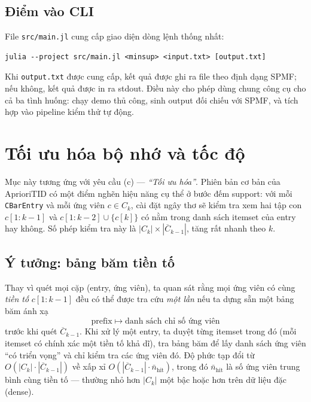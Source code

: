 \subsection{Điểm vào CLI}

File \texttt{src/main.jl} cung cấp giao diện dòng lệnh thống nhất:

\begin{verbatim}
julia --project src/main.jl <minsup> <input.txt> [output.txt]
\end{verbatim}

Khi \texttt{output.txt} được cung cấp, kết quả được ghi ra file theo định dạng SPMF; nếu không, kết quả được in ra stdout. Điều này cho phép dùng chung công cụ cho cả ba tình huống: chạy demo thủ công, sinh output đối chiếu với SPMF, và tích hợp vào pipeline kiểm thử tự động.

\section{Tối ưu hóa bộ nhớ và tốc độ}
\label{sec:impl-optimization}

Mục này tương ứng với yêu cầu (c) --- \emph{``Tối ưu hóa''}. Phiên bản cơ bản của AprioriTID có một điểm nghẽn hiệu năng cụ thể ở bước đếm support: với mỗi \texttt{CBarEntry} và mỗi ứng viên $c \in C_k$, cài đặt ngây thơ sẽ kiểm tra xem hai tập con $c[1{:}k{-}1]$ và $c[1{:}k{-}2] \cup \{c[k]\}$ có nằm trong danh sách itemset của entry hay không. Số phép kiểm tra này là $|C_k| \times |\overline{C}_{k-1}|$, tăng rất nhanh theo $k$.

\subsection{Ý tưởng: bảng băm tiền tố}

Thay vì quét mọi cặp (entry, ứng viên), ta quan sát rằng mọi ứng viên có cùng \emph{tiền tố} $c[1{:}k{-}1]$ đều có thể được tra cứu \emph{một lần} nếu ta dựng sẵn một bảng băm ánh xạ
\[
    \text{prefix} \;\longmapsto\; \text{danh sách chỉ số ứng viên}
\]
trước khi quét $\overline{C}_{k-1}$. Khi xử lý một entry, ta duyệt từng itemset trong đó (mỗi itemset có chính xác một tiền tố khả dĩ), tra bảng băm để lấy danh sách ứng viên ``có triển vọng'' và chỉ kiểm tra các ứng viên đó. Độ phức tạp đổi từ $O(|C_k| \cdot |\overline{C}_{k-1}|)$ về xấp xỉ $O(|\overline{C}_{k-1}| \cdot \bar{n}_{\text{hit}})$, trong đó $\bar{n}_{\text{hit}}$ là số ứng viên trung bình cùng tiền tố --- thường nhỏ hơn $|C_k|$ một bậc hoặc hơn trên dữ liệu đặc (dense).

